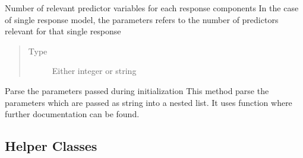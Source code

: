 \documentclass[letterpaper,10pt,english]{sphinxmanual}
\begin{document}
\begin{fulllineitems}
\begin{fulllineitems}
\begin{quote}
\begin{description}
\end{description}\end{quote}

\end{fulllineitems}


\begin{fulllineitems}
\label{\detokenize{Classes:pysimrel.Simrel.n_relpred}}
Number of relevant predictor variables for each response components
In the case of single response model, the parameters refers to the
number of predictors relevant for that single response
\begin{quote}\begin{description}
\item[{Type}] \leavevmode
Either integer or string

\end{description}\end{quote}

\end{fulllineitems}


\begin{fulllineitems}
\label{\detokenize{Classes:pysimrel.Simrel.parse_parameters}}
Parse the parameters passed during initialization
This method parse the parameters which are passed as string into
a nested list. It uses  function where further
documentation can be found.

\end{fulllineitems}


\end{fulllineitems}



\subsection{Helper Classes}
\label{\detokenize{Classes:helper-classes}}
\end{document}
